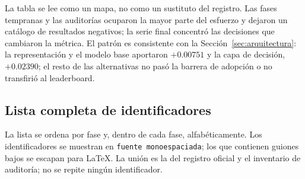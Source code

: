 La tabla se lee como un mapa, no como un sustituto del registro. Las fases
tempranas y las auditorías ocuparon la mayor parte del esfuerzo y dejaron un
catálogo de resultados negativos; la serie final concentró las decisiones que
cambiaron la métrica. El patrón es consistente con la
Sección~\ref{sec:arquitectura}: la representación y el modelo base aportaron
$+0.00751$ y la capa de decisión, $+0.02390$; el resto de las alternativas no
pasó la barrera de adopción o no transfirió al leaderboard.

\subsection{Lista completa de identificadores}
\label{subsec:lista}

La lista se ordena por fase y, dentro de cada fase, alfabéticamente. Los
identificadores se muestran en \texttt{fuente monoespaciada}; los que contienen
guiones bajos se escapan para LaTeX. La unión es la del registro oficial y el
inventario de auditoría; no se repite ningún identificador.

